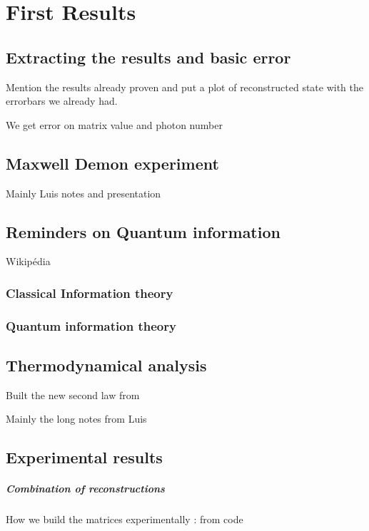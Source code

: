 \documentclass[10pt]{report}
\theoremstyle{plain}
\theoremstyle{definition}
\theoremstyle{remark}
\begin{document}
\chapter{First Results}
\section{Extracting the results and basic error}

Mention the results already proven and put a plot of reconstructed state with
the errorbars we already had.

We get error on matrix value and photon number

\section{Maxwell Demon experiment}

Mainly Luis notes and presentation


\section{Reminders on Quantum information}

Wikipédia

\subsection{Classical Information theory}

\subsection{Quantum information theory}

\section{Thermodynamical analysis}

Built the new second law from

Mainly the long notes from Luis


\section{Experimental results}

\paragraph{Combination of reconstructions} How we build the matrices
experimentally : from code
\end{document}
